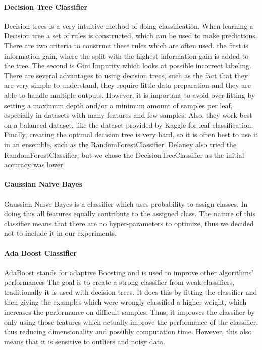 \documentclass{article}
\begin{document}
	\paragraph{Decision Tree Classifier}
		Decision trees is a very intuitive method of doing classification. When learning a Decision tree a set of rules  is constructed, which can be used to make predictions. There are two criteria to construct these rules which are often used. the first is information gain, where the split with the highest information gain is added to the tree. The second is Gini Impurity which looks at possible incorrect labeling. There are several advantages to using decision trees, such as the fact that they are very simple to understand, they require little data preparation and they are able to handle multiple outputs. However, it is important to avoid over-fitting by setting a maximum depth and/or a minimum amount of samples per leaf, especially in datasets with many features and few samples. Also, they work best on a balanced dataset, like the dataset provided by Kaggle for leaf classification. Finally, creating the optimal decision tree is very hard, so it is often best to use it in an ensemble, such as the RandomForestClassifier. Delaney also tried the RandomForestClassifier, but we chose the DecisionTreeClassifier as the initial accuracy was lower.
	
	\paragraph{Gaussian Naive Bayes}
		Gaussian Naive Bayes is a classifier which uses probability to assign classes. In doing this all features equally contribute to the assigned class. The nature of this classifier means that there are no hyper-parameters to optimize, thus we decided not to include it in our experiments.
	
	\paragraph{Ada Boost Classifier}
		AdaBoost stands for adaptive Boosting and is used to improve other algorithms' performances The goal is to create a strong classifier from weak classifiers, traditionally it is used with decision trees. It does this by fitting the classifier and then giving the examples which were wrongly classified a higher weight, which increases the performance on difficult samples. Thus, it improves the classifier by only using those features which actually improve the performance of the classifier, thus reducing dimensionality and possibly computation time. However, this also means that it is sensitive to outliers and noisy data. 
	
\end{document}
